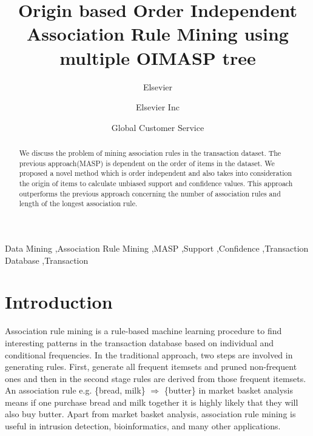 \documentclass[review]{elsarticle}
\begin{document}
\begin{frontmatter}

\title{Origin based Order Independent Association Rule Mining using multiple OIMASP tree}

\author{Elsevier}
\address{Radarweg 29, Amsterdam}

\author[mymainaddress,mysecondaryaddress]{Elsevier Inc}

\author[mysecondaryaddress]{Global Customer Service}

\address[mymainaddress]{1600 John F Kennedy Boulevard, Philadelphia}
\address[mysecondaryaddress]{360 Park Avenue South, New York}

\begin{abstract}
We discuss the problem of mining association rules in the transaction dataset. The previous approach(MASP) is dependent on the order of items in the dataset. We proposed a novel method which is order independent and also takes into consideration the origin of items to calculate unbiased support and confidence values. This approach outperforms the previous approach concerning the number of association rules and length of the longest association rule.
\end{abstract}

\begin{keyword}
Data Mining \sep Association Rule Mining \sep MASP \sep Support 
\sep Confidence \sep Transaction Database \sep Transaction
\end{keyword}

\end{frontmatter}

\section{Introduction}
Association rule mining is a rule-based machine learning procedure to find interesting patterns in the transaction database based on individual and conditional frequencies. In the traditional approach, two steps are involved in generating rules. First, generate all frequent itemsets and pruned non-frequent ones and then in the second stage rules are derived from those frequent itemsets. An association rule e.g. \{bread, milk\} $\Rightarrow$ \{butter\} in market basket analysis means if one purchase bread and milk together it is highly likely that they will also buy butter. Apart from market basket analysis, association rule mining is useful in intrusion detection, bioinformatics, and many other applications.
\end{document}
